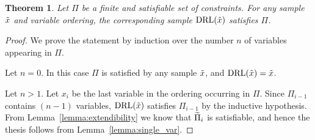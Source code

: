 
\newtheorem*{thm}{Theorem}

\begin{thm}%
    Let $\Pi$ be a finite and satisfiable set of constraints. For any sample $\tilde{x}$ and variable ordering, the corresponding sample $\text{DRL}(\tilde{x})$ satisfies $\Pi$.
\end{thm}

\begin{proof}
    We prove the statement by induction over the number $n$ of variables appearing in $\Pi$. 

    Let $n=0$. In this case $\Pi$  is satisfied by any sample $\tilde{x}$, and $\text{DRL}(\tilde{x}) = \tilde{x}$.

    Let $n > 1$.     Let $x_i$ be the last variable in the ordering occurring in $\Pi$.
    Since $\Pi_{i-1}$ contains $(n-1)$ variables, $\text{DRL}(\tilde{x})$ satisfies $\Pi_{i-1}$ by the inductive hypothesis. From Lemma~\ref{lemma:extendibility} we know that $\widetilde{\Pi}_{i}$ is satisfiable, and hence the thesis follows from Lemma~\ref{lemma:single_var}.
\end{proof}
